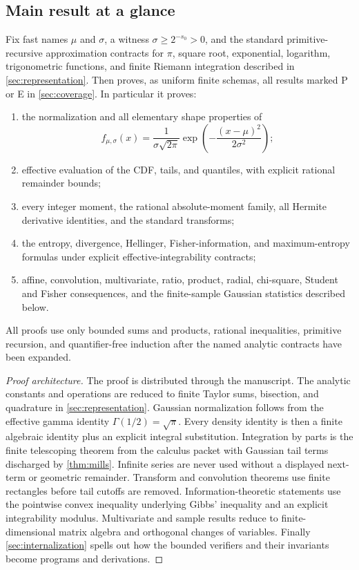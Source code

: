 \subsection{Main result at a glance}

\begin{theorem}\label{thm:master}
Fix fast names $\mu$ and $\sigma$, a witness $\sigma\ge 2^{-s_0}>0$, and the standard primitive-recursive approximation contracts for $\pi$, square root, exponential, logarithm, trigonometric functions, and finite Riemann integration described in \cref{sec:representation}.  Then \ipra{} proves, as uniform finite schemas, all results marked P or E in \cref{sec:coverage}.  In particular it proves:
\begin{enumerate}[label=(\roman*)]
  \item the normalization and all elementary shape properties of
  \[
    f_{\mu,\sigma}(x)=\frac{1}{\sigma\sqrt{2\pi}}
       \exp\!\left(-\frac{(x-\mu)^2}{2\sigma^2}\right);
  \]
  \item effective evaluation of the CDF, tails, and quantiles, with explicit rational remainder bounds;
  \item every integer moment, the rational absolute-moment family, all Hermite derivative identities, and the standard transforms;
  \item the entropy, divergence, Hellinger, Fisher-information, and maximum-entropy formulas under explicit effective-integrability contracts;
  \item affine, convolution, multivariate, ratio, product, radial, chi-square, Student and Fisher consequences, and the finite-sample Gaussian statistics described below.
\end{enumerate}
All proofs use only bounded sums and products, rational inequalities, primitive recursion, and quantifier-free induction after the named analytic contracts have been expanded.
\end{theorem}

\begin{proof}[Proof architecture]
The proof is distributed through the manuscript.  The analytic constants and operations are reduced to finite Taylor sums, bisection, and quadrature in \cref{sec:representation}.  Gaussian normalization follows from the effective gamma identity $\Gamma(1/2)=\sqrt\pi$.  Every density identity is then a finite algebraic identity plus an explicit integral substitution.  Integration by parts is the finite telescoping theorem from the calculus packet with Gaussian tail terms discharged by \cref{thm:mills}.  Infinite series are never used without a displayed next-term or geometric remainder.  Transform and convolution theorems use finite rectangles before tail cutoffs are removed.  Information-theoretic statements use the pointwise convex inequality underlying Gibbs' inequality and an explicit integrability modulus.  Multivariate and sample results reduce to finite-dimensional matrix algebra and orthogonal changes of variables.  Finally \cref{sec:internalization} spells out how the bounded verifiers and their invariants become  programs and  derivations.
\end{proof}

